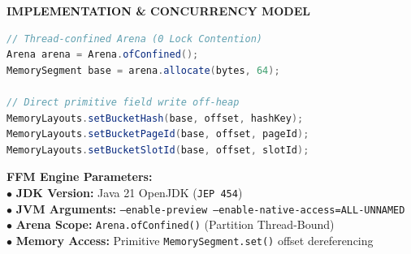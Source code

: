 \documentclass[12pt]{article}
\begin{document}
\begin{minipage}[t]{0.48\textwidth}
    \vspace{0pt}
    {\fontsize{9.5}{11}\selectfont\color{shidenmuted}\textbf{IMPLEMENTATION \& CONCURRENCY MODEL}\par}
    \vspace{3.5mm}
    
    \begin{lstlisting}[language=Java]
// Thread-confined Arena (0 Lock Contention)
Arena arena = Arena.ofConfined();
MemorySegment base = arena.allocate(bytes, 64);

// Direct primitive field write off-heap
MemoryLayouts.setBucketHash(base, offset, hashKey);
MemoryLayouts.setBucketPageId(base, offset, pageId);
MemoryLayouts.setBucketSlotId(base, offset, slotId);
    \end{lstlisting}
    
    \vspace{3.5mm}
    \fontsize{9.5}{12.5}\selectfont
    \noindent\textcolor{shidenaccent}{\textbf{FFM Engine Parameters:}}\\
    \textcolor{shidenpurple}{$\bullet$ \textbf{JDK Version:}} Java 21 OpenJDK (\texttt{JEP 454})\\
    \textcolor{shidenpurple}{$\bullet$ \textbf{JVM Arguments:}} \texttt{--enable-preview --enable-native-access=ALL-UNNAMED}\\
    \textcolor{shidenpurple}{$\bullet$ \textbf{Arena Scope:}} \texttt{Arena.ofConfined()} (Partition Thread-Bound)\\
    \textcolor{shidenpurple}{$\bullet$ \textbf{Memory Access:}} Primitive \texttt{MemorySegment.set()} offset dereferencing
\end{minipage}
\clearpage
\end{document}
